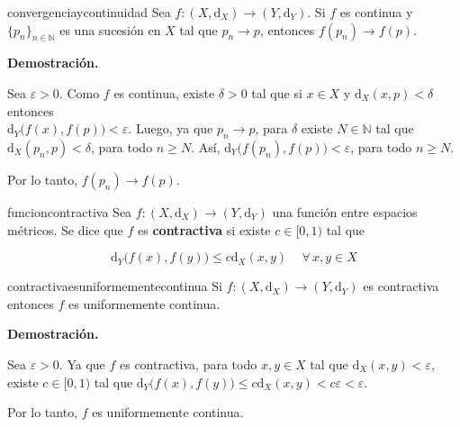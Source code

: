 \documentclass[12pt]{article}
\newenvironment{definicion}[1]{\begin{defi}[breakable, pad at break = 5mm, leftrule = 0.7mm, rightrule = 0.7mm, right = 2mm, left = 2mm, enlarge bottom finally by = 3mm]{}{#1}}{\end{defi}}
\newenvironment{ejercicio}[1]{\begin{ejer}[breakable, pad at break = 5mm, leftrule = 0.7mm, rightrule = 0.7mm, right = 2mm, left = 2mm, enlarge bottom finally by = 3mm, fontlower = \setlength{\parskip}{2mm}]{}{#1}}{\end{ejer}}
\newcommand{\paratodo}{\, \forall \,}
\newcommand{\nat}{\mathbb{N}}
\begin{document}

	\begin{ejercicio}{convergenciaycontinuidad}
		Sea $ f \colon (X, \mathrm{d}_X) \to (Y, \mathrm{d}_Y) $. Si $ f $ es continua y $ \lbrace p_n \rbrace_{n \in \nat} $ es una sucesión en $ X $ tal que $ p_n \to p $, entonces $ f(p_n) \to f(p) $.

		\tcblower

		\textbf{Demostración.}

		Sea $ \varepsilon > 0 $. Como $ f $ es continua, existe $ \delta > 0 $ tal que si $ x \in X $ y $ \mathrm{d}_X(x,p) < \delta $ entonces \\ $ \mathrm{d}_Y \bigl( f(x),f(p) \bigr) < \varepsilon $. Luego, ya que $ p_n \to p $, para $ \delta $ existe $ N \in \nat $ tal que $ \mathrm{d}_X(p_n, p) < \delta $, para todo $ n \geq N $. Así, $ \mathrm{d}_Y \bigl( f(p_n), f(p) \bigr) < \varepsilon $, para todo $ n \geq N $. 

		Por lo tanto, $ f(p_n) \to f(p) $.
	\end{ejercicio}


	\begin{definicion}{funcioncontractiva}
		Sea $ f \colon (X, \mathrm{d}_X) \to (Y, \mathrm{d}_Y) $ una función entre espacios métricos. Se dice que $ f $ es \textbf{contractiva} si existe $ c \in [0,1) $ tal que 

		\begin{equation*}
			\mathrm{d}_Y \bigl( f(x), f(y) \bigr) \leq c \mathrm{d}_X(x,y) \quad \paratodo x, y \in X
		\end{equation*}
	\end{definicion}


	\begin{ejercicio}{contractivaesuniformementecontinua}
		Si $ f \colon (X, \mathrm{d}_X) \to (Y, \mathrm{d}_Y) $ es contractiva entonces $ f $ es uniformemente continua.

		\tcblower

		\textbf{Demostración.}

		Sea $ \varepsilon > 0 $. Ya que $ f $ es contractiva, para todo $ x, y \in X $ tal que $ \mathrm{d}_X(x, y) < \varepsilon $, existe $ c \in [0,1) $ tal que $ \mathrm{d}_Y \bigl( f(x), f(y) \bigr) \leq c \mathrm{d}_X(x,y) < c \varepsilon < \varepsilon $. 

		Por lo tanto, $ f $ es uniformemente continua.
	\end{ejercicio}
\end{document}
